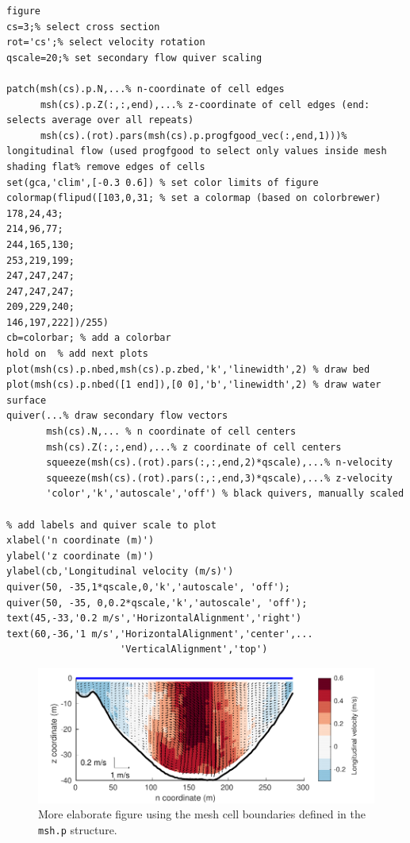 \documentclass{book}
\newcommand{\ml}[1]{\lstinline{#1}}
\begin{document}
\begin{lstlisting}[basicstyle=\mlttfamily\small]
%% Make fancy velocity plot (using p structure in output mesh)
figure
cs=3;% select cross section
rot='cs';% select velocity rotation
qscale=20;% set secondary flow quiver scaling

patch(msh(cs).p.N,...% n-coordinate of cell edges
      msh(cs).p.Z(:,:,end),...% z-coordinate of cell edges (end: selects average over all repeats)
      msh(cs).(rot).pars(msh(cs).p.progfgood_vec(:,end,1)))% longitudinal flow (used progfgood to select only values inside mesh
shading flat% remove edges of cells
set(gca,'clim',[-0.3 0.6]) % set color limits of figure
colormap(flipud([103,0,31; % set a colormap (based on colorbrewer)
178,24,43;  
214,96,77;
244,165,130;
253,219,199;
247,247,247;
247,247,247;
209,229,240;
146,197,222])/255)
cb=colorbar; % add a colorbar
hold on  % add next plots
plot(msh(cs).p.nbed,msh(cs).p.zbed,'k','linewidth',2) % draw bed
plot(msh(cs).p.nbed([1 end]),[0 0],'b','linewidth',2) % draw water surface
quiver(...% draw secondary flow vectors
       msh(cs).N,... % n coordinate of cell centers
       msh(cs).Z(:,:,end),...% z coordinate of cell centers
       squeeze(msh(cs).(rot).pars(:,:,end,2)*qscale),...% n-velocity
       squeeze(msh(cs).(rot).pars(:,:,end,3)*qscale),...% z-velocity
       'color','k','autoscale','off') % black quivers, manually scaled

% add labels and quiver scale to plot
xlabel('n coordinate (m)')
ylabel('z coordinate (m)')
ylabel(cb,'Longitudinal velocity (m/s)')
quiver(50, -35,1*qscale,0,'k','autoscale', 'off');
quiver(50, -35, 0,0.2*qscale,'k','autoscale', 'off');
text(45,-33,'0.2 m/s','HorizontalAlignment','right')
text(60,-36,'1 m/s','HorizontalAlignment','center',...
                    'VerticalAlignment','top')
\end{lstlisting}

\begin{figure}[p]
  \centering
  \includegraphics[width=\linewidth]{figures/proc_trans_results.pdf}
  \caption{More elaborate figure using the mesh cell boundaries defined in the \ml{msh.p} structure.}
  \label{fig:fancy_plot}
\end{figure}
\end{document}
